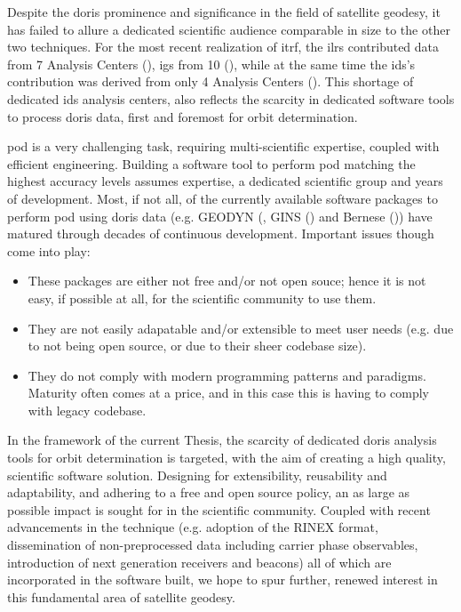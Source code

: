 Despite the \gls{doris} prominence and significance in the field of satellite geodesy,
it has failed to allure a dedicated scientific audience comparable in size to 
the other two techniques. For the most recent realization of \gls{itrf}, the 
\gls{ilrs} contributed data from 7 Analysis Centers (\cite{Pavlis2023}), \gls{igs} 
from 10 (\cite{Rebischung2021}), while at the same time the \gls{ids}'s contribution 
was derived from only 4 Analysis Centers (\cite{Moreaux2022}). This shortage of 
dedicated \gls{ids} analysis centers, also reflects the scarcity in dedicated 
software tools to process \gls{doris} data, first and foremost for orbit 
determination.

\gls{pod} is a very challenging task, requiring multi-scientific expertise,
coupled with efficient engineering. Building a software tool to perform \gls{pod} 
matching the highest accuracy levels assumes expertise, a dedicated scientific 
group and years of development. Most, if not all, of the currently available 
software packages to perform \gls{pod} using \gls{doris} data (e.g. GEODYN (\cite{Geodyn2015}, 
GINS (\cite{Gins2013}) and Bernese (\cite{Stepanek2010})) have matured through 
decades of continuous development. Important issues though come into play:
\begin{itemize}
  \item These packages are either not free and/or not open souce; hence it is not 
    easy, if possible at all, for the scientific community to use them.
  \item They are not easily adapatable and/or extensible to meet user needs (e.g. due 
    to not being open source, or due to their sheer codebase size).
  \item They do not comply with modern programming patterns and paradigms. Maturity 
    often comes at a price, and in this case this is having to comply with legacy 
    codebase.
\end{itemize}

In the framework of the current Thesis, the scarcity of dedicated \gls{doris}
analysis tools for orbit determination is targeted, with the aim of creating
a high quality, scientific software solution. Designing for extensibility, 
reusability and adaptability, and adhering to a free and open source policy, an 
as large as possible impact is sought for in the scientific community. Coupled 
with recent advancements in the technique (e.g. adoption of the RINEX format, 
dissemination of non-preprocessed data including carrier phase observables, 
introduction of next generation receivers and beacons) all of which are 
incorporated in the software built, we hope to spur further, renewed interest 
in this fundamental area of satellite geodesy.

